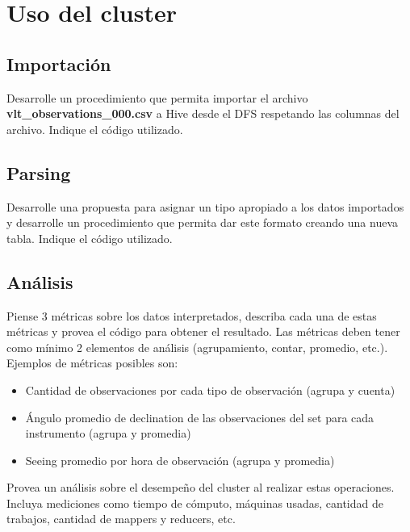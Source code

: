 \documentclass[9pt,letterpaper,twoside]{article}
\begin{document}
\begin{code}[H]
    
\end{code}

\newpage

\section{Uso del cluster}

\subsection{Importación}

{\color{red} Desarrolle un procedimiento que permita importar el archivo \textbf{vlt\_observations\_000.csv} a Hive desde el DFS respetando las columnas del archivo. Indique el código utilizado.}

\subsection{Parsing}

{\color{red} Desarrolle una propuesta para asignar un tipo apropiado a los datos importados y desarrolle un procedimiento que permita dar este formato creando una nueva tabla. Indique el código utilizado.}

\subsection{Análisis}

{\color{red} Piense 3 métricas sobre los datos interpretados, describa cada una de estas métricas y provea el código para obtener el resultado. Las métricas deben tener como mínimo 2 elementos de análisis (agrupamiento, contar, promedio, etc.). Ejemplos de métricas posibles son:
\begin{itemize}
  \item Cantidad de observaciones por cada tipo de observación (agrupa y cuenta)
  \item Ángulo promedio de declination de las observaciones del set para cada instrumento (agrupa y promedia)
  \item Seeing promedio por hora de observación (agrupa y promedia)
\end{itemize}
Provea un análisis sobre el desempeño del cluster al realizar estas operaciones. Incluya mediciones como tiempo de cómputo, máquinas usadas, cantidad de trabajos, cantidad de mappers y reducers, etc.}
\end{document}

